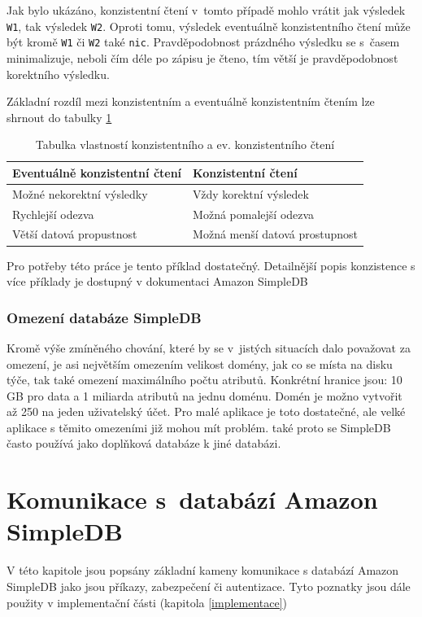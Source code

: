 \documentclass[oneside,12pt]{fithesis2}
\begin{document}
Jak bylo ukázáno, konzistentní čtení v~tomto případě mohlo vrátit jak výsledek \verb<W1<, tak výsledek \verb<W2<. Oproti tomu, výsledek eventuálně konzistentního čtení může být kromě \verb<W1< či \verb<W2< také \verb<nic<. Pravděpodobnost prázdného výsledku se s~časem minimalizuje, neboli čím déle po zápisu je čteno, tím větší je pravděpodobnost korektního výsledku.


Základní rozdíl mezi konzistentním a eventuálně konzistentním čtením lze shrnout do tabulky \ref{consistencyTable}
\begin{table}[h]
 \vspace{5mm}
 \begin{tabular}{l|l}
    Eventuálně konzistentní čtení & Konzistentní čtení\\ \hline
    Možné nekorektní výsledky & Vždy korektní výsledek\\ 
    Rychlejší odezva & Možná pomalejší odezva \\
    Větší datová propustnost & Možná menší datová prostupnost
 \end{tabular}
 \caption{Tabulka vlastností konzistentního a ev. konzistentního čtení}
 \label{consistencyTable}
\end{table}

Pro potřeby této práce je tento příklad dostatečný. Detailnější popis konzistence s více příklady je dostupný v dokumentaci Amazon SimpleDB \cite[strana 7, Consistency]{simpledbDeveloper}

\subsection{Omezení databáze SimpleDB}
Kromě výše zmíněného chování, které by se v~jistých situacích dalo považovat za omezení, je asi největším omezením velikost domény, jak co se místa na disku týče, tak také omezení maximálního počtu atributů. Konkrétní hranice jsou: 10 GB pro data a 1 miliarda atributů na jednu doménu. Domén je možno vytvořit až 250 na jeden uživatelský účet. Pro malé aplikace je toto dostatečné, ale velké aplikace s těmito omezeními již mohou mít problém. také proto se SimpleDB často používá jako doplňková databáze k jiné databázi\cite{nosqlNetflix}.


\chapter{Komunikace s~databází Amazon SimpleDB}
V této kapitole jsou popsány základní kameny komunikace s databází Amazon SimpleDB jako jsou příkazy, zabezpečení či autentizace. Tyto poznatky jsou dále použity v implementační části (kapitola \ref{implementace})
\end{document}
